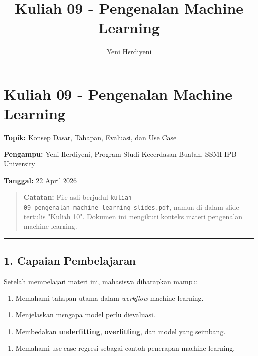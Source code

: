 \documentclass[12pt,a4paper]{article}
\title{Kuliah 09 - Pengenalan Machine Learning}
\author{Yeni Herdiyeni}
\date{}
\begin{document}
\maketitle
\tableofcontents
\newpage

\section{Kuliah 09 - Pengenalan Machine Learning}

\textbf{Topik:} Konsep Dasar, Tahapan, Evaluasi, dan Use Case  

\textbf{Pengampu:} Yeni Herdiyeni, Program Studi Kecerdasan Buatan, SSMI-IPB University  

\textbf{Tanggal:} 22 April 2026


\begin{quote}
\textbf{Catatan:} File asli berjudul \texttt{kuliah-09_pengenalan_machine_learning_slides.pdf}, namun di dalam slide tertulis "Kuliah 10". Dokumen ini mengikuti konteks materi pengenalan machine learning.\end{quote}


\hrule


\subsection{1. Capaian Pembelajaran}

Setelah mempelajari materi ini, mahasiswa diharapkan mampu:


\begin{enumerate}
\item Memahami tahapan utama dalam \emph{workflow} machine learning.
\end{enumerate}

\begin{enumerate}
\item Menjelaskan mengapa model perlu dievaluasi.
\end{enumerate}

\begin{enumerate}
\item Membedakan \textbf{underfitting}, \textbf{overfitting}, dan model yang seimbang.
\end{enumerate}

\begin{enumerate}
\item Memahami use case regresi sebagai contoh penerapan machine learning.
\end{enumerate}
\end{document}
